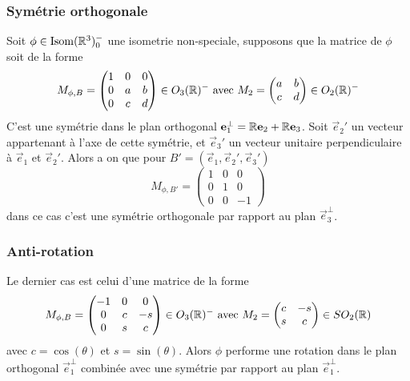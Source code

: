 \subsubsection{Symétrie orthogonale}

Soit $\phi \in \operatorname{Isom}(\mathbb{R}^3)_0^-$ une isometrie non-speciale, supposons que la
matrice de $\phi$ soit de la forme
\begin{equation*}
	M_{\phi, B} = 
	\begin{pmatrix}
		1 & 0 & 0 \\
		0 & a & b \\
		0 & c & d
	\end{pmatrix}
	\in O_3(\mathbb{R})^-
	\textrm{ avec }
	M_2 = 
	\begin{pmatrix}
		a & b \\
		c & d
	\end{pmatrix}
	\in O_2(\mathbb{R})^-
\end{equation*}
C'est une symétrie dans le plan orthogonal $\mathbf{e}_1^\perp = \mathbb{R}\mathbf{e}_2 +
\mathbb{R}\mathbf{e}_3$. Soit $\vec{e}_2'$ un vecteur appartenant à l'axe de cette
symétrie, et $\vec{e}_3'$ un vecteur unitaire perpendiculaire à $\vec{e}_1$ et
$\vec{e}_2'$. Alors a on que pour $B' = (\vec{e}_1, \vec{e}_2', \vec{e}_3')$
\begin{equation*}
	M_{\phi, B'} =
	\begin{pmatrix}
		1 & 0 & 0 \\
		0 & 1 & 0 \\
		0 & 0 & -1
	\end{pmatrix}
\end{equation*}
dans ce cas c'est une symétrie orthogonale par rapport au plan
$\vec{e}_3^\perp$.

\subsubsection{Anti-rotation}

Le dernier cas est celui d'une matrice de la forme
\begin{equation*}
	M_{\phi, B} =
	\begin{pmatrix}
		-1 & 0 & 0 \\
		0 & c & -s \\
		0 & s & c
	\end{pmatrix}
	\in O_3(\mathbb{R})^-\textrm{ avec }M_2 = 
	\begin{pmatrix}
		c & -s \\
		s & c
	\end{pmatrix}
\in SO_2(\mathbb{R})
\end{equation*}
avec $c = \cos(\theta)$ et $s = \sin(\theta)$. Alors $\phi$ performe une
rotation dans le plan orthogonal $\vec{e}_1^\perp$ combinée avec une symétrie
par rapport au plan $\vec{e}_1^\perp$.

